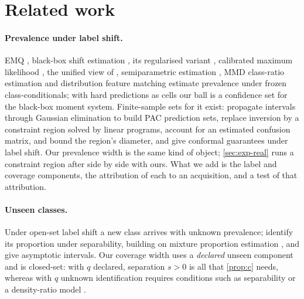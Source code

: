 \documentclass[twoside]{article}
\begin{document}
\section{Related work}
\label{sec:related}

\paragraph{Prevalence under label shift.} EMQ \citep{saerens2002adjusting}, black-box shift
estimation \citep{lipton2018detecting}, its regularised variant \citep{azizzadenesheli2019regularized},
calibrated maximum likelihood \citep{alexandari2020maximum}, the unified view of
\citet{garg2020unified}, semiparametric estimation \citep{tian2023elsa}, MMD class-ratio estimation
\citep{iyer2014maximum} and distribution feature matching \citep{dussap2023label} estimate
prevalence under frozen class-conditionals; with hard predictions as cells our ball is a confidence
set for the black-box moment system. Finite-sample sets for it exist: \citet{si2023pac} propagate
intervals through Gaussian elimination to build PAC prediction sets, \citet{li2026matrix} replace
inversion by a constraint region solved by linear programs, account for an estimated confusion
matrix, and bound the region's diameter, and \citet{podkopaev2021distribution} give conformal
guarantees under label shift. Our prevalence width is the same kind of object; \cref{sec:exp-real}
runs a constraint region after \citet{li2026matrix} side by side with ours. What we add is the label
and coverage components, the attribution of each to an acquisition, and a test of that attribution.

\paragraph{Unseen classes.} Under open-set label shift a new class arrives with unknown prevalence;
\citet{garg2022domain} identify its proportion under separability, building on mixture proportion
estimation \citep{ramaswamy2016mixture}, and \citet{liu2025semiparametric} give asymptotic intervals.
Our coverage width uses a \emph{declared} unseen component and is closed-set: with $q$ declared,
separation $s>0$ is all that \cref{prop:c} needs, whereas with $q$ unknown identification requires
conditions such as separability \citep{garg2022domain} or a density-ratio model
\citep{liu2025semiparametric}.
\end{document}
